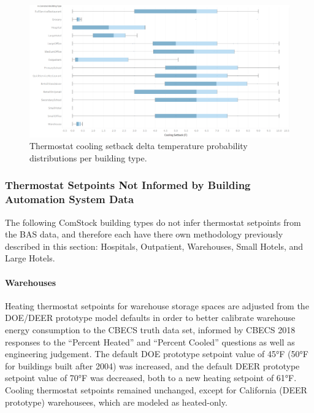 \begin{figure}
    \centering \includegraphics[width=1.0\textwidth]{figures/cooling_setbacks.png}
    \caption{Thermostat cooling setback delta temperature probability distributions per building type.}
    \label{fig:therm_cooling_setback}
\end{figure}

\subsubsection{Thermostat Setpoints Not Informed by Building Automation System Data}
The following ComStock building types do not infer thermostat setpoints from the BAS data, and therefore each have there own methodology previously described in this section: Hospitals, Outpatient, Warehouses, Small Hotels, and Large Hotels.
\paragraph{Warehouses}

Heating thermostat setpoints for warehouse storage spaces are adjusted from the DOE/DEER prototype model defaults in order to better calibrate warehouse energy consumption to the CBECS truth data set, informed by CBECS 2018 \citep{eia2018cbecs} responses to the ``Percent Heated'' and ``Percent Cooled'' questions as well as engineering judgement. The default DOE prototype setpoint value of 45°F (50°F for buildings built after 2004) was increased, and the default DEER prototype setpoint value of 70°F was decreased, both to a new heating setpoint of 61°F. Cooling thermostat setpoints remained unchanged, except for California (DEER prototype) warehousees, which are modeled as heated-only.

